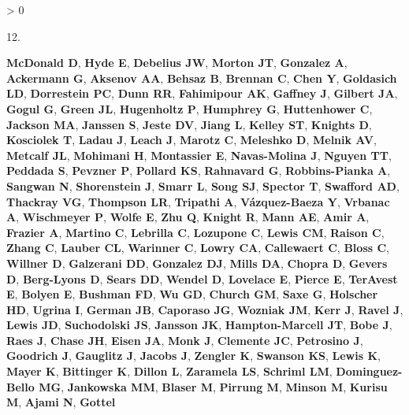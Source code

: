 \documentclass[
]{article}
\newlength{\cslhangindent}
\newlength{\csllabelwidth}
\newenvironment{CSLReferences}[3] %
 {%
  \setlength{\parindent}{0pt}
  \ifodd #1 \everypar{\setlength{\hangindent}{\cslhangindent}}\ignorespaces\fi
  \ifnum #2 > 0
  \setlength{\parskip}{#2\baselineskip}
  \fi
 }%
 {}
\newcommand{\CSLLeftMargin}[1]{\parbox[t]{\csllabelwidth}{#1}}
\newcommand{\CSLRightInline}[1]{\parbox[t]{\linewidth - \csllabelwidth}{#1}}
\begin{document}
\begin{CSLReferences}{0}{0}
\leavevmode\hypertarget{ref-McDonald2018}{}%
\CSLLeftMargin{12. }
\CSLRightInline{\textbf{McDonald D}, \textbf{Hyde E}, \textbf{Debelius
JW}, \textbf{Morton JT}, \textbf{Gonzalez A}, \textbf{Ackermann G},
\textbf{Aksenov AA}, \textbf{Behsaz B}, \textbf{Brennan C}, \textbf{Chen
Y}, \textbf{Goldasich LD}, \textbf{Dorrestein PC}, \textbf{Dunn RR},
\textbf{Fahimipour AK}, \textbf{Gaffney J}, \textbf{Gilbert JA},
\textbf{Gogul G}, \textbf{Green JL}, \textbf{Hugenholtz P},
\textbf{Humphrey G}, \textbf{Huttenhower C}, \textbf{Jackson MA},
\textbf{Janssen S}, \textbf{Jeste DV}, \textbf{Jiang L}, \textbf{Kelley
ST}, \textbf{Knights D}, \textbf{Kosciolek T}, \textbf{Ladau J},
\textbf{Leach J}, \textbf{Marotz C}, \textbf{Meleshko D}, \textbf{Melnik
AV}, \textbf{Metcalf JL}, \textbf{Mohimani H}, \textbf{Montassier E},
\textbf{Navas-Molina J}, \textbf{Nguyen TT}, \textbf{Peddada S},
\textbf{Pevzner P}, \textbf{Pollard KS}, \textbf{Rahnavard G},
\textbf{Robbins-Pianka A}, \textbf{Sangwan N}, \textbf{Shorenstein J},
\textbf{Smarr L}, \textbf{Song SJ}, \textbf{Spector T}, \textbf{Swafford
AD}, \textbf{Thackray VG}, \textbf{Thompson LR}, \textbf{Tripathi A},
\textbf{Vázquez-Baeza Y}, \textbf{Vrbanac A}, \textbf{Wischmeyer P},
\textbf{Wolfe E}, \textbf{Zhu Q}, \textbf{Knight R}, \textbf{Mann AE},
\textbf{Amir A}, \textbf{Frazier A}, \textbf{Martino C},
\textbf{Lebrilla C}, \textbf{Lozupone C}, \textbf{Lewis CM},
\textbf{Raison C}, \textbf{Zhang C}, \textbf{Lauber CL},
\textbf{Warinner C}, \textbf{Lowry CA}, \textbf{Callewaert C},
\textbf{Bloss C}, \textbf{Willner D}, \textbf{Galzerani DD},
\textbf{Gonzalez DJ}, \textbf{Mills DA}, \textbf{Chopra D},
\textbf{Gevers D}, \textbf{Berg-Lyons D}, \textbf{Sears DD},
\textbf{Wendel D}, \textbf{Lovelace E}, \textbf{Pierce E},
\textbf{TerAvest E}, \textbf{Bolyen E}, \textbf{Bushman FD}, \textbf{Wu
GD}, \textbf{Church GM}, \textbf{Saxe G}, \textbf{Holscher HD},
\textbf{Ugrina I}, \textbf{German JB}, \textbf{Caporaso JG},
\textbf{Wozniak JM}, \textbf{Kerr J}, \textbf{Ravel J}, \textbf{Lewis
JD}, \textbf{Suchodolski JS}, \textbf{Jansson JK},
\textbf{Hampton-Marcell JT}, \textbf{Bobe J}, \textbf{Raes J},
\textbf{Chase JH}, \textbf{Eisen JA}, \textbf{Monk J}, \textbf{Clemente
JC}, \textbf{Petrosino J}, \textbf{Goodrich J}, \textbf{Gauglitz J},
\textbf{Jacobs J}, \textbf{Zengler K}, \textbf{Swanson KS},
\textbf{Lewis K}, \textbf{Mayer K}, \textbf{Bittinger K}, \textbf{Dillon
L}, \textbf{Zaramela LS}, \textbf{Schriml LM}, \textbf{Dominguez-Bello
MG}, \textbf{Jankowska MM}, \textbf{Blaser M}, \textbf{Pirrung M},
\textbf{Minson M}, \textbf{Kurisu M}, \textbf{Ajami N}, \textbf{Gottel
}}
\end{CSLReferences}
\end{document}
